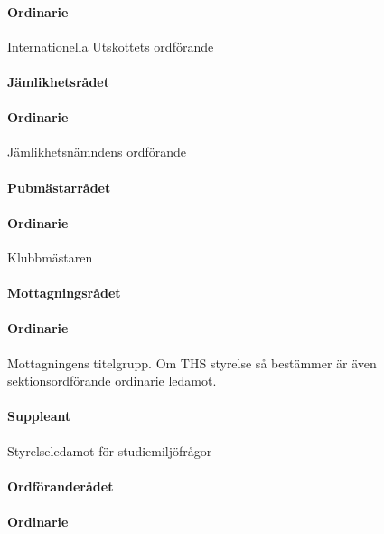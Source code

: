 \documentclass[a4paper,12pt]{article}
\begin{document}
\paragraph{Ordinarie}

Internationella Utskottets ordförande

\paragraph{Jämlikhetsrådet}

\paragraph{Ordinarie}

Jämlikhetsnämndens ordförande

\paragraph{Pubmästarrådet}

\paragraph{Ordinarie}

Klubbmästaren

\paragraph{Mottagningsrådet}

\paragraph{Ordinarie}

Mottagningens titelgrupp. Om THS styrelse så bestämmer är även sektionsordförande ordinarie ledamot.

\paragraph{Suppleant}

Styrelseledamot för studiemiljöfrågor

\paragraph{Ordföranderådet}

\paragraph{Ordinarie}
\end{document}
